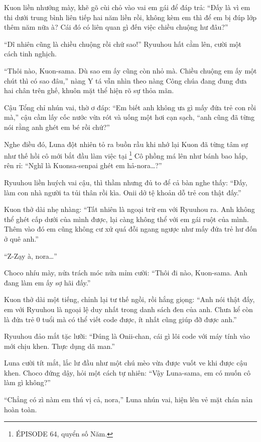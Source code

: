 \documentclass[../main.tex]{subfiles}
\begin{document}
Kuon liền nhướng mày, khẽ gõ cùi chỏ vào vai em gái để đáp trả: ``Đấy là vì em thi dưới trung bình liên tiếp hai năm liền rồi, không kèm em thì để em bị đúp lớp thêm năm nữa à? Cái đó có liên quan gì đến việc chiều chuộng hư đâu?''

``Dĩ nhiên cũng là chiều chuộng rồi chứ sao!'' Ryuuhou hất cằm lên, cười một cách tinh nghịch.

``Thôi nào, Kuon-sama. Dù sao em ấy cũng còn nhỏ mà. Chiều chuộng em ấy một chút thì có sao đâu,'' nàng Y tá vẫn nhìn theo nàng Công chúa đang đung đưa hai chân trên ghế, khuôn mặt thể hiện rõ sự thỏa mãn.

Cậu Tổng chỉ nhún vai, thờ ơ đáp: ``Em biết anh không ưa gì mấy đứa trẻ con rồi mà,'' cậu cầm lấy cốc nước vừa rót và uống một hơi cạn sạch, ``anh cũng đã từng nói rằng anh ghét em bé rồi chứ?''

Nghe điều đó, Luna đột nhiên tỏ ra buồn rầu khi nhớ lại Kuon đã từng tâm sự như thế hồi cô mới bắt đầu làm việc tại \hll\footnote{{\flaregothic ÉPISODE 64}, quyển số Năm.} Cô phồng má lên như bánh bao hấp, rên rỉ: ``Nghĩ là Kuonsa-senpai ghét em hả-nora\dots?''

Ryuuhou liền huých vai cậu, thì thầm nhưng đủ to để cả bàn nghe thấy: ``Đấy, làm con nhà người ta tủi thân rồi kìa. Onii dở tệ khoản dỗ trẻ con thật đấy.''

Kuon thở dài nhẹ nhàng: ``Tất nhiên là ngoại trừ em với Ryuuhou ra. Anh không thể ghét cấp dưới của mình được, lại càng không thể với em gái ruột của mình. Thêm vào đó em cũng không cư xử quá đỗi ngang ngược như mấy đứa trẻ hư đốn ở quê anh.''

``Z-Zạy à, nora\dots''

Choco nhíu mày, nửa trách móc nửa mỉm cười: ``Thôi đi nào, Kuon-sama. Anh đang làm em ấy sợ hãi đấy.''

Kuon thở dài một tiếng, chỉnh lại tư thế ngồi, rồi hắng giọng: ``Anh nói thật đấy, em với Ryuuhou là ngoại lệ duy nhất trong danh sách đen của anh. Chưa kể còn là đứa trẻ 0 tuổi mà có thể viết code được, ít nhất cũng giúp đỡ được anh.''

Ryuuhou đảo mắt tặc lưỡi: ``Đúng là Onii-chan, cái gì lôi code với máy tính vào mới chịu khen. Thực dụng dã man.''

Luna cười tít mắt, lắc lư đầu như một chú mèo vừa được vuốt ve khi được cậu khen. Choco đứng dậy, hỏi một cách tự nhiên: ``Vậy Luna-sama, em có muốn cô làm gì không?''

``Chẳng có zì nàm em thú vị cả, nora,'' Luna nhún vai, hiện lên vẻ mặt chán nản hoàn toàn.
\end{document}
